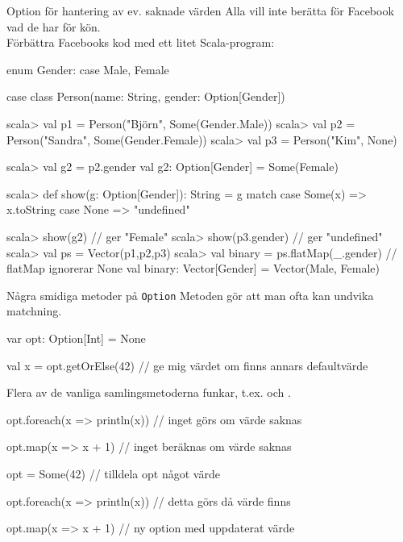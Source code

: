 \begin{Slide}{Option för hantering av ev. saknade värden}\SlideFontTiny
Alla vill inte berätta för Facebook vad de har för kön. \\ Förbättra Facebooks kod med ett litet Scala-program:
\begin{CodeSmall}
enum Gender:
  case Male, Female

case class Person(name: String, gender: Option[Gender])
\end{CodeSmall}
\pause
\begin{REPLsmall}
scala> val p1 = Person("Björn",  Some(Gender.Male))
scala> val p2 = Person("Sandra", Some(Gender.Female))
scala> val p3 = Person("Kim",  None)

scala> val g2 = p2.gender
val g2: Option[Gender] = Some(Female)

scala> def show(g: Option[Gender]): String = g match 
         case Some(x) => x.toString
         case None    => "undefined"

scala> show(g2)                              // ger "Female"
scala> show(p3.gender)                       // ger "undefined"
scala> val ps = Vector(p1,p2,p3)
scala> val binary = ps.flatMap(_.gender)     // flatMap ignorerar None
val binary: Vector[Gender] = Vector(Male, Female)
\end{REPLsmall}
\end{Slide}

\begin{Slide}{Några smidiga metoder på \texttt{Option}}\SlideFontSmall
Metoden  gör att man ofta kan undvika matchning.
\begin{Code}
var opt: Option[Int] = None

val x = opt.getOrElse(42)   // ge mig värdet om finns annars defaultvärde 
\end{Code}

Flera av de vanliga samlingsmetoderna funkar, t.ex.  och .
\begin{Code}
opt.foreach(x => println(x)) // inget görs om värde saknas

opt.map(x => x + 1)          // inget beräknas om värde saknas

opt = Some(42)               // tilldela opt något värde

opt.foreach(x => println(x)) // detta görs då värde finns

opt.map(x => x + 1)          // ny option med uppdaterat värde

\end{Code}
\end{Slide}


